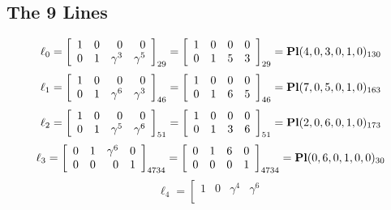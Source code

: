 \documentclass{article}
\begin{document}
{\subsection*{The 9 Lines}
$$
\ell_{0} = 
\left[
\begin{array}{*{4}{r}}
1 & 0 & 0 & 0\\
0 & 1 & \gamma^{3} & \gamma^{5}\\
\end{array}
\right]
_{29}
=
\left[
\begin{array}{*{4}c}
1  & 0  & 0  & 0\\
0  & 1  & 5  & 3\\
\end{array}
\right]_{29}
={\rm\bf Pl}(4,0,3,0,1,0 )_{130}$$
$$
\ell_{1} = 
\left[
\begin{array}{*{4}{r}}
1 & 0 & 0 & 0\\
0 & 1 & \gamma^{6} & \gamma^{3}\\
\end{array}
\right]
_{46}
=
\left[
\begin{array}{*{4}c}
1  & 0  & 0  & 0\\
0  & 1  & 6  & 5\\
\end{array}
\right]_{46}
={\rm\bf Pl}(7,0,5,0,1,0 )_{163}$$
$$
\ell_{2} = 
\left[
\begin{array}{*{4}{r}}
1 & 0 & 0 & 0\\
0 & 1 & \gamma^{5} & \gamma^{6}\\
\end{array}
\right]
_{51}
=
\left[
\begin{array}{*{4}c}
1  & 0  & 0  & 0\\
0  & 1  & 3  & 6\\
\end{array}
\right]_{51}
={\rm\bf Pl}(2,0,6,0,1,0 )_{173}$$
$$
\ell_{3} = 
\left[
\begin{array}{*{4}{r}}
0 & 1 & \gamma^{6} & 0\\
0 & 0 & 0 & 1\\
\end{array}
\right]
_{4734}
=
\left[
\begin{array}{*{4}c}
0  & 1  & 6  & 0\\
0  & 0  & 0  & 1\\
\end{array}
\right]_{4734}
={\rm\bf Pl}(0,6,0,1,0,0 )_{30}$$
$$
\ell_{4} = 
\left[
\begin{array}{*{4}{r}}
1 & 0 & \gamma^{4} & \gamma^{6}\\

\end{array}$$}
\end{document}
